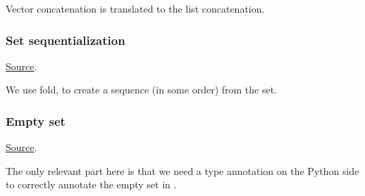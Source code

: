 
\begin{mathpar}
\end{mathpar}
Vector concatenation is translated to the list concatenation.

\subsubsection{Set sequentialization}
\href{https://github.com/saltiniroberto/ssf/blob/7ea6e18093d9da3154b4e396dd435549f687e6b9/high_level/common/pythonic_code_generic.py#L23-L24}{Source}.



\begin{mathpar}
\end{mathpar}
We use fold, to create a sequence (in some order) from the set.

\subsubsection{ Empty set}
\href{https://github.com/saltiniroberto/ssf/blob/7ea6e18093d9da3154b4e396dd435549f687e6b9/high_level/common/pythonic_code_generic.py#L27-L28}{Source}.



\begin{mathpar}
\end{mathpar}
The only relevant part here is that we need a type annotation on the Python side to correctly annotate the empty set in \tlap{}.

